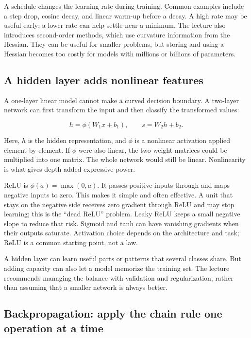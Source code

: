 A schedule changes the learning rate during training. Common examples include a step drop, cosine decay, and linear warm-up before a decay. A high rate may be useful early; a lower rate can help settle near a minimum. The lecture also introduces second-order methods, which use curvature information from the Hessian. They can be useful for smaller problems, but storing and using a Hessian becomes too costly for models with millions or billions of parameters.

\subsection{A hidden layer adds nonlinear features}\label{04-visual-computing-ii-ch031-a-hidden-layer-adds-nonlinear-features}

A one-layer linear model cannot make a curved decision boundary. A two-layer network can first transform the input and then classify the transformed values:

\[h=\phi(W_1x+b_1),\qquad s=W_2h+b_2.\]

Here, \(h\) is the hidden representation, and \(\phi\) is a nonlinear activation applied element by element. If \(\phi\) were also linear, the two weight matrices could be multiplied into one matrix. The whole network would still be linear. Nonlinearity is what gives depth added expressive power.

ReLU is \(\phi(a)=\max(0,a)\). It passes positive inputs through and maps negative inputs to zero. This makes it simple and often effective. A unit that stays on the negative side receives zero gradient through ReLU and may stop learning; this is the ``dead ReLU'' problem. Leaky ReLU keeps a small negative slope to reduce that risk. Sigmoid and tanh can have vanishing gradients when their outputs saturate. Activation choice depends on the architecture and task; ReLU is a common starting point, not a law.

A hidden layer can learn useful parts or patterns that several classes share. But adding capacity can also let a model memorize the training set. The lecture recommends managing the balance with validation and regularization, rather than assuming that a smaller network is always better.

\subsection{Backpropagation: apply the chain rule one operation at a time}\label{04-visual-computing-ii-ch031-backpropagation-apply-the-chain-rule-one-operation-at-a-time}


